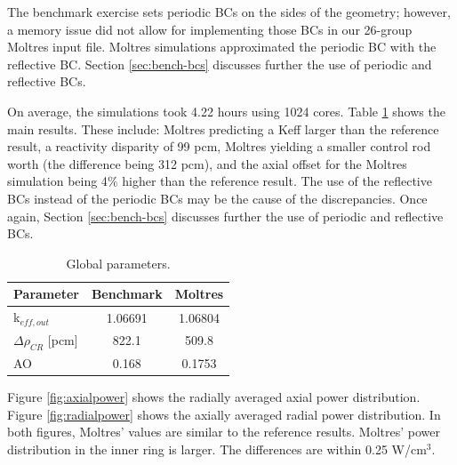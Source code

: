 The benchmark exercise sets periodic \glspl{BC} on the sides of the geometry; however, a memory issue did not allow for implementing those BCs in our 26-group Moltres input file.
Moltres simulations approximated the periodic BC with the reflective BC.
Section \ref{sec:bench-bcs} discusses further the use of periodic and reflective BCs.

On average, the simulations took 4.22 hours using 1024 cores.
Table \ref{tab:globalparam} shows the main results.
These include: Moltres predicting a \gls{Keff} larger than the reference result, a reactivity disparity of 99 pcm, Moltres yielding a smaller control rod worth (the difference being 312 pcm), and the axial offset for the Moltres simulation being 4$\%$ higher than the reference result.
The use of the reflective BCs instead of the periodic BCs may be the cause of the discrepancies.
Once again, Section \ref{sec:bench-bcs} discusses further the use of periodic and reflective BCs.

\begin{table}[htbp!]
  \centering
  \caption{Global parameters.}
  \begin{tabular}{lcc}
  \toprule
  Parameter 	&  Benchmark  &  Moltres    \\
  \midrule
  k$_{eff, out}$ 	&  1.06691    &  1.06804    \\
  $\Delta \rho_{CR}$ [pcm]  & 822.1 	& 509.8 \\
  AO        	&  0.168      &  0.1753     \\
  \bottomrule
  \end{tabular}
  \label{tab:globalparam}
\end{table}

Figure \ref{fig:axialpower} shows the radially averaged axial power distribution.
Figure \ref{fig:radialpower} shows the axially averaged radial power distribution.
In both figures, Moltres' values are similar to the reference results.
Moltres' power distribution in the inner ring is larger.
The differences are within 0.25 W/cm$^3$.

